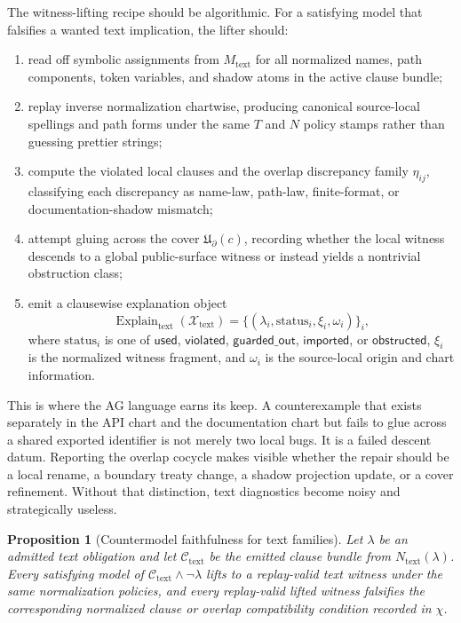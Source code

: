 \documentclass[11pt]{report}
\newtheorem{proposition}[definition]{Proposition}
\begin{document}
The witness-lifting recipe should be algorithmic. For a satisfying model that falsifies a wanted text implication, the lifter should:
\begin{enumerate}
\item read off symbolic assignments from $M_{\mathrm{text}}$ for all normalized names, path components, token variables, and shadow atoms in the active clause bundle;
\item replay inverse normalization chartwise, producing canonical source-local spellings and path forms under the same $T$ and $N$ policy stamps rather than guessing prettier strings;
\item compute the violated local clauses and the overlap discrepancy family $\eta_{ij}$, classifying each discrepancy as name-law, path-law, finite-format, or documentation-shadow mismatch;
\item attempt gluing across the cover $\mathfrak{U}_{\partial}(c)$, recording whether the local witness descends to a global public-surface witness or instead yields a nontrivial obstruction class;
\item emit a clausewise explanation object
\[
\operatorname{Explain}_{\mathrm{text}}(\mathcal{X}_{\mathrm{text}})
=
\{(\lambda_i,\mathrm{status}_i,\xi_i,\omega_i)\}_i,
\]
where $\mathrm{status}_i$ is one of $\mathsf{used}$, $\mathsf{violated}$, $\mathsf{guarded\_out}$, $\mathsf{imported}$, or $\mathsf{obstructed}$, $\xi_i$ is the normalized witness fragment, and $\omega_i$ is the source-local origin and chart information.
\end{enumerate}

This is where the AG language earns its keep. A counterexample that exists separately in the API chart and the documentation chart but fails to glue across a shared exported identifier is not merely two local bugs. It is a failed descent datum. Reporting the overlap cocycle makes visible whether the repair should be a local rename, a boundary treaty change, a shadow projection update, or a cover refinement. Without that distinction, text diagnostics become noisy and strategically useless.

\begin{proposition}[Countermodel faithfulness for text families]
Let $\lambda$ be an admitted text obligation and let $\mathcal{C}_{\mathrm{text}}$ be the emitted clause bundle from $N_{\mathrm{text}}(\lambda)$. Every satisfying model of $\mathcal{C}_{\mathrm{text}}\wedge \neg \lambda$ lifts to a replay-valid text witness under the same normalization policies, and every replay-valid lifted witness falsifies the corresponding normalized clause or overlap compatibility condition recorded in $\chi$.
\end{proposition}
\end{document}
